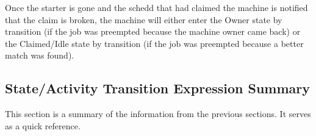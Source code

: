 Once the starter is gone and the schedd that had claimed the
machine is notified that the claim is broken, the machine will either
enter the Owner state by transition  (if the job was
preempted because the machine owner came back) or the Claimed/Idle
state by transition  (if the job was preempted because a
better match was found). 

\subsection{\label{sec:State-Expression-Summary}
State/Activity Transition Expression Summary}
This section is a summary of the information from the
previous sections.
It serves as a quick reference.

